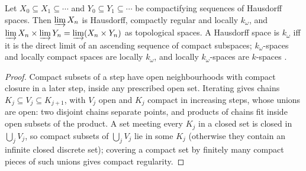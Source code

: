 \begin{theorem}
  \label{thm:top-dl-compactifying}
  \leanok
  Let $X_0 \subseteq X_1 \subseteq \cdots$ and $Y_0 \subseteq Y_1 \subseteq \cdots$ be
  compactifying sequences of Hausdorff spaces. Then $\varinjlim X_n$ is Hausdorff, compactly
  regular and locally $k_\omega$, and $\varinjlim X_n \times \varinjlim Y_n =
  \varinjlim (X_n \times Y_n)$ as topological spaces. A Hausdorff space is $k_\omega$ iff it is
  the direct limit of an ascending sequence of compact subspaces; $k_\omega$-spaces and locally
  compact spaces are locally $k_\omega$, and locally $k_\omega$-spaces are $k$-spaces
  \cite[Remark~A.7.19]{GN26}.
\end{theorem}

\begin{proof}
  \leanok
  Compact subsets of a step have open neighbourhoods with compact closure in a later step, inside
  any prescribed open set. Iterating gives chains $K_j \subseteq V_j \subseteq K_{j+1}$, with $V_j$
  open and $K_j$ compact in increasing steps, whose unions are open: two disjoint chains separate
  points, and products of chains fit inside open subsets of the product. A set meeting every
  $K_j$ in a closed set is closed in $\bigcup_j V_j$, so compact subsets of $\bigcup_j V_j$ lie in
  some $K_j$ (otherwise they contain an infinite closed discrete set); covering a compact set by
  finitely many compact pieces of such unions gives compact regularity.
\end{proof}

